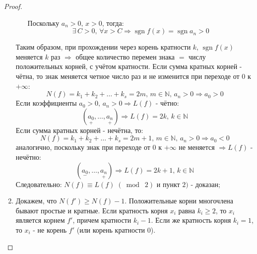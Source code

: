 \documentclass[12pt]{article}
\newcommand{\MN}{\mathbb{N}}
\theoremstyle{definition}
\DeclareMathOperator{\sgn}{sgn}
\newcommand{\modn}[3]{#1 \equiv #2 \; (\bmod \; #3)}
\begin{document}
\begin{proof}
\begin{enumerate}[label=(\arabic*)]
\begin{enumerate}[label=\alph*)]
$$			$$
			Поскольку $a_n > 0, \, x > 0$, тогда:
			$$
				\exists \, C > 0, \, \forall x > C \Rightarrow \sgn f(x) = \sgn a_n > 0
			$$
		\end{enumerate}
		Таким образом, при прохождении через корень кратности $k$, $\sgn f(x)$ меняется $k$ раз $\Rightarrow$ 
		общее количество перемен знака $=$ числу положительных корней, с учётом кратности. Если сумма кратных корней - чётна, то знак меняется четное число раз и не изменится при переходе от $0$ к $+\infty$:
		$$
			N(f) = k_1 + k_2 + \dotsc + k_s = 2m, \, m \in \MN, \, a_n > 0 \Rightarrow a_0 > 0
		$$
		Если коэффициенты $a_0 > 0, \, a_n > 0 \Rightarrow L(f)$ - чётно:
		$$
			(\underset{+}{a_0}, \dotsc, \underset{+}{a_n}) \Rightarrow L(f) = 2k, \, k \in \MN
		$$
		Если сумма кратных корней - нечётна, то:
		$$
			N(f) = k_1 + k_2 + \dotsc + k_s = 2m + 1, \, m \in \MN, \, a_n > 0 \Rightarrow a_0 < 0
		$$	
		аналогично, поскольку знак при переходе от $0$ к $+\infty$ не меняется $\Rightarrow L(f)$ - нечётно:
		$$
			(\underset{-}{a_0}, \dotsc, \underset{+}{a_n})  \Rightarrow L(f) = 2k + 1, \, k \in \MN
		$$
		Следовательно: $\modn{N(f)}{L(f)}{2}$ и пункт $2)$ - доказан;
		\item Докажем, что $N(f') \geq N(f) -1$. Положительные корни многочлена бывают простые и кратные. Если кратность корня $x_i$ равна $k_i \geq 2$, то $x_i$ является корнем $f'$, причем кратности $k_i -1$. Если же кратность корня $k_i = 1$, то $x_i$ - не корень $f'$ (или корень кратности $0$). 
		

\end{enumerate}
\end{proof}
\end{document}
